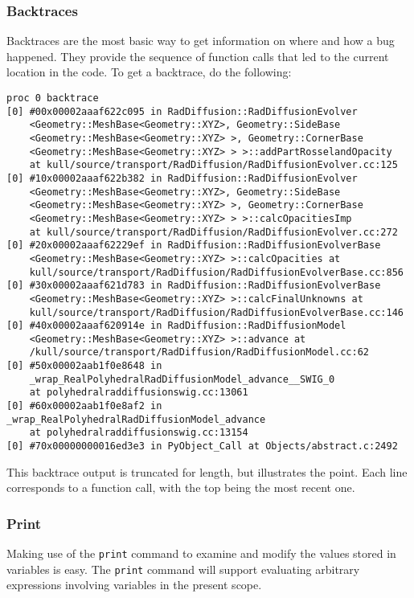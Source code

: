 \documentclass{refart}
\begin{document}
\subsubsection{Backtraces}

Backtraces are the most basic way to get information on where and how a bug happened. They provide the sequence of function calls that led to the current location in the code. To get a backtrace, do the following:

\begin{Verbatim}
proc 0 backtrace
[0] #00x00002aaaf622c095 in RadDiffusion::RadDiffusionEvolver
    <Geometry::MeshBase<Geometry::XYZ>, Geometry::SideBase
    <Geometry::MeshBase<Geometry::XYZ> >, Geometry::CornerBase
    <Geometry::MeshBase<Geometry::XYZ> > >::addPartRosselandOpacity
    at kull/source/transport/RadDiffusion/RadDiffusionEvolver.cc:125
[0] #10x00002aaaf622b382 in RadDiffusion::RadDiffusionEvolver
    <Geometry::MeshBase<Geometry::XYZ>, Geometry::SideBase
    <Geometry::MeshBase<Geometry::XYZ> >, Geometry::CornerBase
    <Geometry::MeshBase<Geometry::XYZ> > >::calcOpacitiesImp
    at kull/source/transport/RadDiffusion/RadDiffusionEvolver.cc:272
[0] #20x00002aaaf62229ef in RadDiffusion::RadDiffusionEvolverBase
    <Geometry::MeshBase<Geometry::XYZ> >::calcOpacities at
    kull/source/transport/RadDiffusion/RadDiffusionEvolverBase.cc:856
[0] #30x00002aaaf621d783 in RadDiffusion::RadDiffusionEvolverBase
    <Geometry::MeshBase<Geometry::XYZ> >::calcFinalUnknowns at
    kull/source/transport/RadDiffusion/RadDiffusionEvolverBase.cc:146
[0] #40x00002aaaf620914e in RadDiffusion::RadDiffusionModel
    <Geometry::MeshBase<Geometry::XYZ> >::advance at
    /kull/source/transport/RadDiffusion/RadDiffusionModel.cc:62
[0] #50x00002aab1f0e8648 in
    _wrap_RealPolyhedralRadDiffusionModel_advance__SWIG_0
    at polyhedralraddiffusionswig.cc:13061
[0] #60x00002aab1f0e8af2 in _wrap_RealPolyhedralRadDiffusionModel_advance
    at polyhedralraddiffusionswig.cc:13154
[0] #70x00000000016ed3e3 in PyObject_Call at Objects/abstract.c:2492
\end{Verbatim}

This backtrace output is truncated for length, but illustrates the point. Each line corresponds to a function call, with the top being the most recent one.

\subsubsection{Print}

Making use of the \texttt{print} command to examine and modify the values stored in variables is easy. The \texttt{print} command will support evaluating arbitrary expressions involving variables in the present scope.
\end{document}
